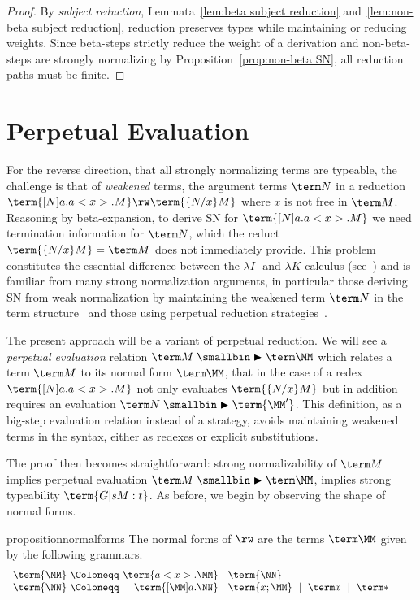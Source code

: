 \documentclass[a4paper,UKenglish,cleveref, autoref, thm-restate]{lipics-v2021}
\newcommand\rp{\mathrel{\smallbin\blacktriangleright}}
\begin{document}
\begin{proof}
By \emph{subject reduction}, Lemmata~\ref{lem:beta subject reduction} and~\ref{lem:non-beta subject reduction}, reduction preserves types while maintaining or reducing weights. Since beta-steps strictly reduce the weight of a derivation and non-beta-steps are strongly normalizing by Proposition~\ref{prop:non-beta SN}, all reduction paths must be finite.
\end{proof}


\section{Perpetual Evaluation}
\label{sec:perp}

For the reverse direction, that all strongly normalizing terms are typeable, the challenge is that of \emph{weakened} terms, the argument terms $\term N$ in a reduction $\term{[N]a.a<x>.M}\rw\term{\{N/x\}M}$ where $x$ is not free in $\term M$. Reasoning by beta-expansion, to derive SN for $\term{[N]a.a<x>.M}$ we need termination information for $\term N$, which the reduct $\term{\{N/x\}M}=\term M$ does not immediately provide. This problem constitutes the essential difference between the $\lambda I$- and $\lambda K$-calculus (see~\cite{Barendregt-1984}) and is familiar from many strong normalization arguments, in particular those deriving SN from weak normalization by maintaining the weakened term $\term N$ in the term structure~\cite{Klop-1980,Nederpelt-1973} and those using perpetual reduction strategies~\cite{Bergstra-Klop-1982,Raamsdonk-Severi-Sorensen-Xi-1999}.

The present approach will be a variant of perpetual reduction. We will see a \emph{perpetual evaluation} relation $\term M\rp\term\MM$ which relates a term $\term M$ to its normal form $\term\MM$, that in the case of a redex $\term{[N]a.a<x>.M}$ not only evaluates $\term{\{N/x\}M}$ but in addition requires an evaluation $\term N\rp\term{\MM'}$. This definition, as a big-step evaluation relation instead of a strategy, avoids maintaining weakened terms in the syntax, either as redexes or explicit substitutions.

The proof then becomes straightforward: strong normalizability of $\term M$ implies perpetual evaluation $\term M\rp\term\MM$, implies strong typeability $\term{G |s M:t}$. As before, we begin by observing the shape of normal forms.

\begin{restatable}{proposition}{normalforms}
The normal forms of $\rw$ are the terms $\term\MM$ given by the following grammars.
\[
\begin{array}{l@{~}l@{~}r@{~}l@{~}l}
	\term{\MM} &\Coloneqq&   \term{a<x>.\MM} &\mid& \term{\NN}
\\	\term{\NN} &\Coloneqq& \term{[\MM]a.\NN} &\mid& \term{x;\MM} ~\mid~ \term x ~\mid~ \term*
\end{array}
\qquad
\]
\end{restatable}
\end{document}
